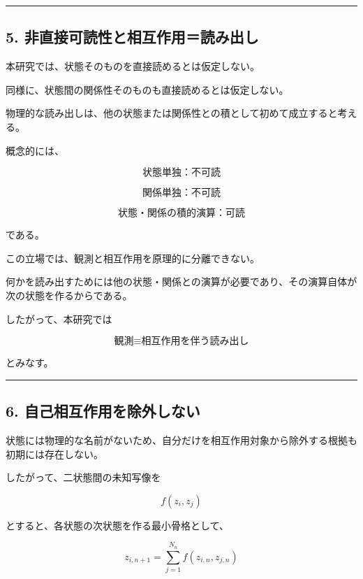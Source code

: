 \documentclass[
  a4paper,
]{ltjsarticle}
\begin{document}
\begin{center}\rule{0.5\linewidth}{0.5pt}\end{center}

\subsection{5.
非直接可読性と相互作用＝読み出し}\label{ux975eux76f4ux63a5ux53efux8aadux6027ux3068ux76f8ux4e92ux4f5cux7528ux8aadux307fux51faux3057}

本研究では、状態そのものを直接読めるとは仮定しない。

同様に、状態間の関係性そのものも直接読めるとは仮定しない。

物理的な読み出しは、他の状態または関係性との積として初めて成立すると考える。

概念的には、

\[
\boxed{
\text{状態単独：不可読}
}
\]

\[
\boxed{
\text{関係単独：不可読}
}
\]

\[
\boxed{
\text{状態・関係の積的演算：可読}
}
\]

である。

この立場では、観測と相互作用を原理的に分離できない。

何かを読み出すためには他の状態・関係との演算が必要であり、その演算自体が次の状態を作るからである。

したがって、本研究では

\[
\boxed{
\text{観測}\equiv\text{相互作用を伴う読み出し}
}
\]

とみなす。

\begin{center}\rule{0.5\linewidth}{0.5pt}\end{center}

\subsection{6.
自己相互作用を除外しない}\label{ux81eaux5df1ux76f8ux4e92ux4f5cux7528ux3092ux9664ux5916ux3057ux306aux3044}

状態には物理的な名前がないため、自分だけを相互作用対象から除外する根拠も初期には存在しない。

したがって、二状態間の未知写像を

\[
f(z_i,z_j)
\]

とすると、各状態の次状態を作る最小骨格として、

\[
\boxed{
 z_{i,n+1}
 =
 \sum_{j=1}^{N_n} f(z_{i,n},z_{j,n})
}
\]
\end{document}
